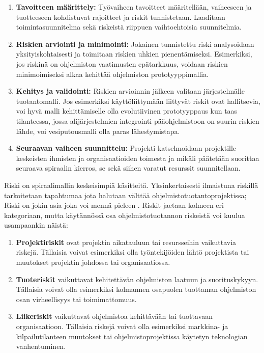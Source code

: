 \documentclass[finnish,12pt]{tktltiki2}
\theoremstyle{definition}
\theoremstyle{remark}
\begin{document}
\begin{enumerate}
\item \textbf{Tavoitteen määrittely:} Työvaiheen tavoitteet määritellään, vaiheeseen ja tuotteeseen kohdistuvat rajoitteet ja riskit tunnistetaan. Laaditaan toimintasuunnitelma sekä riskeistä riippuen vaihtoehtoisia suunnitelmia.
\item \textbf{Riskien arviointi ja minimointi:} Jokainen tunnistettu riski analysoidaan yksityiskohtaisesti ja toimitaan riskien uhkien pienentämiseksi. Esimerkiksi, jos riskinä on ohjelmiston vaatimusten epätarkkuus, voidaan riskien minimoimiseksi alkaa kehittää ohjelmiston prototyyppimallia. 
\item \textbf{Kehitys ja validointi:} Riskien arvioinnin jälkeen valitaan järjestelmälle tuotantomalli. Jos esimerkiksi käyttöliittymään liittyvät riskit ovat hallitsevia, voi hyvä malli kehittämiselle olla evolutiivinen prototyyppaus kun taas tilanteessa, jossa alijärjestelmien integrointi pääohjelmistoon on suurin riskien lähde, voi vesiputousmalli olla paras lähestymistapa.
\item \textbf{Seuraavan vaiheen suunnittelu: } Projekti katselmoidaan projektille keskeisten ihmisten ja organisaatioiden toimesta ja mikäli päätetään suorittaa seuraava spiraalin kierros, se sekä siihen varatut resurssit suunnitellaan.
\end{enumerate}

Riski on spiraalimallin keskeisimpiä käsitteitä. Yksinkertaisesti ilmaistuna riskillä tarkoitetaan tapahtumaa jota halutaan välttää ohjelmistotuotantoprojektissa; Riski on jokin asia joka voi mennä pieleen \cite{Sommerville10}. Riskit jaetaan kolmeen eri kategoriaan, mutta käytännössä osa ohjelmistotuotannon riskeistä voi kuulua usampaankin näistä:

\begin{enumerate}
\item \textbf{Projektiriskit} ovat projektin aikatauluun tai resursseihin vaikuttavia riskejä. Tällaisia voivat esimerkiksi olla työntekijöiden lähtö projektista tai muutokset projektin johdossa tai organisaatiossa.
\item \textbf{Tuoteriskit} vaikuttavat kehitettävän ohjelmiston laatuun ja suorituskykyyn. Tällaisia voivat olla esimerkiksi kolmannen osapuolen tuottaman ohjelmiston osan virheellisyys tai toimimattomuus.
\item \textbf{Liikeriskit} vaikuttavat ohjelmistoa kehittävään tai tuottavaan organisaatioon. Tällaisia riskejä voivat olla esimerkiksi markkina- ja kilpailutilanteen muutokset tai ohjelmistoprojektissa käytetyn teknologian vanhentuminen. 
\end{enumerate}
\end{document}
